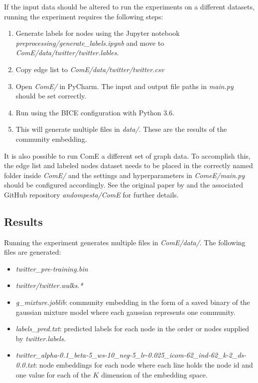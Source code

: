 \documentclass[sigconf]{acmart}
\begin{document}
If the input data should be altered to run the experiments on a different datasets, running the experiment requires the following steps:

\begin{enumerate}
	\item Generate labels for nodes using the Jupyter notebook \textit{preprocessing/generate\_labels.ipynb} and move to \textit{ComE/data/twitter/twitter.lables}.
	\item Copy edge list to \textit{ComE/data/twitter/twitter.csv}
	\item Open \textit{ComE/} in PyCharm. The input and output file paths in \textit{main.py} should be set correctly.
	\item Run using the BICE configuration with Python 3.6.
	\item This will generate multiple files in \textit{data/}. These are the results of the community embedding.
\end{enumerate}

It is also possible to run ComE a different set of graph data. To accomplish this, the edge list and labeled nodes dataset needs to be placed in the correctly named folder inside \textit{ComE/} and the settings and hyperparameters in \textit{ComeE/main.py} should be configured accordingly. See the original paper by \citeauthor{Cav17}\cite{Cav17} and the associated GitHub repository \textit{andompesta/ComE}\cite{ComE} for further details.

\subsection{Results} \label{apply_ComE}

Running the experiment generates multiple files in \textit{ComE/data/}. The following files are generated:
\begin{itemize}
	\item \textit{twitter\_pre-training.bin}
	\item \textit{twitter/twitter.walks.*}
	\item \textit{g\_mixture.joblib}: community embedding in the form of a saved binary of the gaussian mixture model where each gaussian represents one community.
	\item \textit{labels\_pred.txt}: predicted labels for each node in the order or nodes supplied by \textit{twitter.labels}.
	\item \textit{twitter\_alpha-0.1\_beta-5\_ws-10\_neg-5\_lr-0.025\_icom-62\_ind-62\_k-2\_ds-0.0.txt}: node embeddings for each node where each line holds the node id and one value for each of the $K$ dimension of the embedding space.
\end{itemize}
\end{document}
